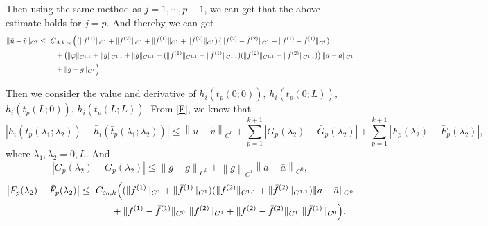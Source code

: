 \documentclass[a4paper,reqno,11pt]{amsart}
\numberwithin{equation}{section} %
\begin{document}
Then using the same method as $j=1,\cdots,p-1$, we can get that the above estimate holds for $j=p$. And thereby we can get
\[
\begin{aligned}
\|\tilde u-\tilde v\|_{C^{1}}
\le{}&\ C_{A,k,\varepsilon_0}\Bigl(
  (\|f^{(1)}\|_{C^{1}}+\|f^{(2)}\|_{C^{1}}
   +\|\bar f^{(1)}\|_{C^{1}}+\|\bar f^{(2)}\|_{C^{1}})\,
  (\|f^{(2)}-\bar f^{(2)}\|_{C^{1}}+\|f^{(1)}-\bar f^{(1)}\|_{C^{1}}) \\
&\quad + \bigl(\|\varphi\|_{C^{1,1}}+\|g\|_{C^{1,1}}+\|\bar g\|_{C^{1,1}}
   + (\|f^{(1)}\|_{C^{1,1}}+\|\bar f^{(1)}\|_{C^{1,1}})
     (\|f^{(2)}\|_{C^{1,1}}+\|\bar f^{(2)}\|_{C^{1,1}})\bigr)\,
     \|a-\bar a\|_{C^{1}} \\
&\quad + \|g-\bar g\|_{C^{1}}
\Bigr).
\end{aligned}
\]

Then we consider the value and derivative of $h_i(t_p(0;0))$, $h_i(t_p(0;L))$, $h_i(t_p(L;0))$, $h_i(t_p(L;L))$. From \eqref{F}, we know that
$$
\left| h_i\left( t_p\left( \lambda _1;\lambda _2 \right) \right) -\bar{h}_i\left( \bar{t}_p\left( \lambda _1;\lambda _2 \right) \right) \right|\leq \left\| \tilde{u}-\tilde{v} \right\| _{C^0}+\sum_{p=1}^{k+1}{\left| G_p\left( \lambda _2 \right) -\bar{G}_p\left( \lambda _2 \right) \right|}+\sum_{p=1}^{k+1}{\left| F_p\left( \lambda _2 \right) -\bar{F}_p\left( \lambda _2 \right) \right|},
$$
where $\lambda _1,\lambda _2=0,L$. And
$$
\left| G_p\left( \lambda _2 \right) -\bar{G}_p\left( \lambda _2 \right) \right|\le \left\| g-\bar{g} \right\| _{C^0}+\left\| g \right\| _{C^1}\left\| a-\bar{a} \right\| _{C^0},
$$
\[
\begin{aligned}
\bigl|F_p(\lambda_2)-\bar F_p(\lambda_2)\bigr|
\le{}&\ C_{\varepsilon_0,k}\Bigl(
  (\|f^{(1)}\|_{C^{1}}+\|\bar f^{(1)}\|_{C^{1}})
  (\|f^{(2)}\|_{C^{1,1}}+\|\bar f^{(2)}\|_{C^{1,1}})
  \|a-\bar a\|_{C^{0}} \\
&\qquad + \|f^{(1)}-\bar f^{(1)}\|_{C^{0}}\ \|f^{(2)}\|_{C^{1}}
  + \|f^{(2)}-\bar f^{(2)}\|_{C^{1}}\ \|\bar f^{(1)}\|_{C^{0}}
\Bigr).
\end{aligned}
\]
\end{document}
